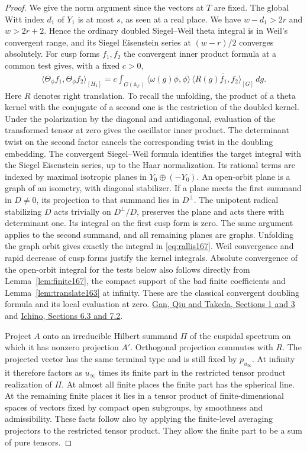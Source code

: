 \documentclass[a4paper,11pt]{article}
\theoremstyle{definition}
\theoremstyle{remark}
\numberwithin{equation}{section}
\begin{document}
\begin{proof}
We give the norm argument since the vectors at \(T\) are
fixed. The global Witt index \(d_1\) of \(Y_1\) is at most
\(s\), as seen at a real place. We have \(w-d_1>2r\)
and \(w>2r+2\). Hence the ordinary doubled Siegel--Weil
theta integral is in Weil's convergent range, and its Siegel
Eisenstein series at \((w-r)/2\) converges absolutely.
For cusp forms \(f_1,f_2\) the convergent inner product
formula at a common test gives, with a fixed \(c>0\),
\begin{align}
 \langle\Theta_\phi f_1,\Theta_\phi f_2\rangle_{[H_1]}
  = c\int_{G(\mathbb A_F)}
     \langle\omega(g)\phi,\phi\rangle\,
       \overline{\langle R(g)f_1,f_2\rangle_{[G]}}\,dg .
 \label{eq:rallis167}
\end{align}
Here \(R\) denotes right translation. To recall the unfolding,
the product of a theta kernel with the conjugate of a second
one is the restriction of the doubled kernel. Under the
polarization by the diagonal and antidiagonal, evaluation of
the transformed tensor at zero gives the oscillator inner
product. The determinant twist on the second factor cancels
the corresponding twist in the doubling embedding. The
convergent Siegel--Weil formula identifies the target integral
with the Siegel Eisenstein series, up to the Haar normalization.
Its rational terms are indexed by maximal isotropic planes
in \(Y_0\oplus(-Y_0)\). An open-orbit plane is a graph of
an isometry, with diagonal stabilizer. If a plane meets the
first summand in \(D\ne0\), its projection to that summand
lies in \(D^\perp\). The unipotent radical stabilizing \(D\)
acts trivially on \(D^\perp/D\), preserves the plane and acts
there with determinant one. Its integral on the first cusp
form is zero. The same argument applies to the second summand,
and all remaining planes are graphs. Unfolding the graph
orbit gives exactly the integral in \eqref{eq:rallis167}.
Weil convergence and rapid decrease of cusp forms justify
the kernel integrals. Absolute convergence of the open-orbit
integral for the tests below also follows directly from
Lemma~\ref{lem:finite167}, the compact support of the bad
finite coefficients and Lemma~\ref{lem:translate163} at
infinity. These are the classical convergent doubling formula
and its local evaluation at zero.
\href{https://arxiv.org/pdf/1207.4709}{Gan, Qiu and Takeda,
Sections 1 and 3} and
\href{https://arxiv.org/pdf/2002.09148}{Ichino, Sections 6.3
and 7.2}.

Project \(A\) onto an irreducible Hilbert summand \(\Pi\) of
the cuspidal spectrum on which it has nonzero projection
\(A'\). Orthogonal projection commutes with \(R\). The
projected vector has the same terminal type and is still
fixed by \(p_{u_\infty}\). At infinity it therefore factors
as \(u_\infty\) times its finite part in the restricted
tensor product realization of \(\Pi\). At almost all finite
places the finite part has the spherical line. At the
remaining finite places it lies in a tensor product of
finite-dimensional spaces of vectors fixed by compact open
subgroups, by smoothness and admissibility. These facts follow
also by applying the finite-level averaging projectors to
the restricted tensor product. They allow the finite part
to be a sum of pure tensors.


\end{proof}
\end{document}
